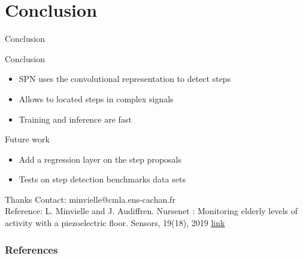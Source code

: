 \documentclass[8pt,t,aspectratio=1610]{beamer}
\begin{document}
\section{Conclusion}

\begin{frame}{Conclusion}

\centering
\begin{minipage}[t]{0.8\linewidth}
Conclusion
\begin{itemize}
    \item SPN uses the convolutional representation to detect steps
    \item Allows to located steps in complex signals
    \item Training and inference are fast
\end{itemize}
Future work
\begin{itemize}
    \item Add a regression layer on the step proposals
    \item Tests on step detection benchmarks data sets
\end{itemize}
\end{minipage}

\vfill
\pause
\begin{block}{\centering Thanks}
\medskip
Contact: minvielle@cmla.ens-cachan.fr\\[5pt]
Reference: L. Minvielle and J. Audiffren. Nursenet : Monitoring elderly levels of activity with a
piezoelectric floor. Sensors, 19(18), 2019
\; \href{https://www.mdpi.com/1424-8220/19/18/3851}{{ link}}
\end{block}
\end{frame}

%

\begin{frame}[allowframebreaks]
        \frametitle{References}
        
        
\end{frame}
\end{document}
